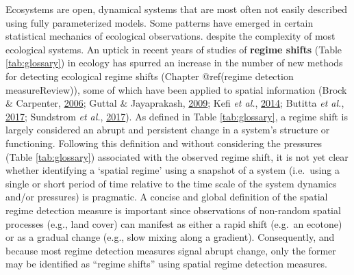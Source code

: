 \documentclass[12pt,twoside,openany]{reedthesis}
\begin{document}
Ecosystems are open, dynamical systems that are most often not easily described using fully parameterized models. Some patterns have emerged in certain statistical mechanics of ecological observations. despite the complexity of most ecological systems. An uptick in recent years of studies of \textbf{regime shifts} (Table \ref{tab:glossary}) in ecology has spurred an increase in the number of new methods for detecting ecological regime shifts (Chapter @ref(regime detection measureReview)), some of which have been applied to spatial information (Brock \& Carpenter, \protect\hyperlink{ref-brock_variance_2006}{2006}; Guttal \& Jayaprakash, \protect\hyperlink{ref-guttal2009spatial}{2009}; Kefi \emph{et al.}, \protect\hyperlink{ref-kefi2014early}{2014}; Butitta \emph{et al.}, \protect\hyperlink{ref-butitta_spatial_2017}{2017}; Sundstrom \emph{et al.}, \protect\hyperlink{ref-sundstrom2017detecting}{2017}). As defined in Table \ref{tab:glossary}, a regime shift is largely considered an abrupt and persistent change in a system's structure or functioning. Following this definition and without considering the pressures (Table \ref{tab:glossary}) associated with the observed regime shift, it is not yet clear whether identifying a `spatial regime' using a snapshot of a system (i.e.~using a single or short period of time relative to the time scale of the system dynamics and/or pressures) is pragmatic. A concise and global definition of the spatial regime detection measure is important since observations of non-random spatial processes (e.g., land cover) can manifest as either a rapid shift (e.g.~an ecotone) or as a gradual change (e.g., slow mixing along a gradient). Consequently, and because most regime detection measures signal abrupt change, only the former may be identified as ``regime shifts'' using spatial regime detection measures.
\end{document}
